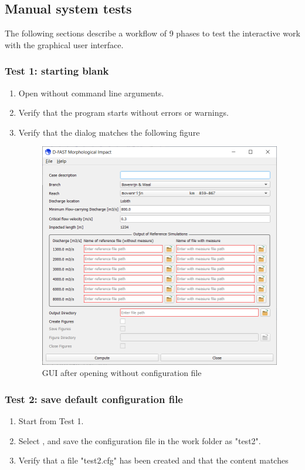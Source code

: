 \subsection{Manual system tests} \label{Sec:GuiTests}
The following sections describe a workflow of 9 phases to test the interactive work with the graphical user interface.

\subsubsection{Test 1: starting blank}
\begin{enumerate}
\item Open \dfastmi without command line arguments.
\item Verify that the program starts without errors or warnings.
\item Verify that the dialog matches the following figure
\begin{figure}[H]
\center
\includegraphics[width=12cm]{figures/main_dialog.png}
\caption{GUI after opening without configuration file}
\label{fig:test1.png}
\end{figure}
\end{enumerate}

\subsubsection{Test 2: save default configuration file}
\begin{enumerate}
\item Start from Test 1.
\item Select  \textrightarrow {}, and save the configuration file in the work folder as "test2".
\item Verify that a file "test2.cfg" has been created and that the content matches

\end{enumerate}

